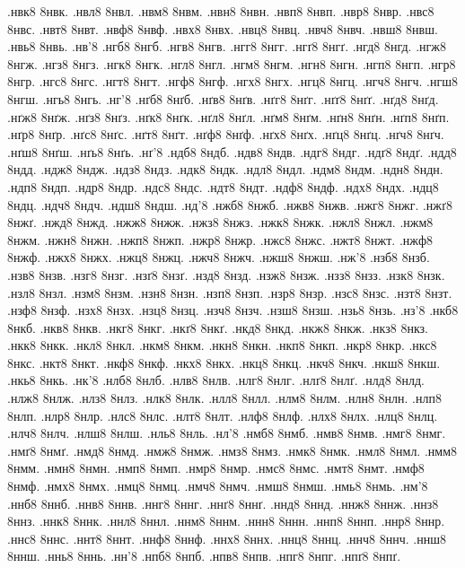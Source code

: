 {.нвк8
8нвк.
.нвл8
8нвл.
.нвм8
8нвм.
.нвн8
8нвн.
.нвп8
8нвп.
.нвр8
8нвр.
.нвс8
8нвс.
.нвт8
8нвт.
.нвф8
8нвф.
.нвх8
8нвх.
.нвц8
8нвц.
.нвч8
8нвч.
.нвш8
8нвш.
.нвь8
8нвь.
.нв'8
.нгб8
8нгб.
.нгв8
8нгв.
.нгг8
8нгг.
.нгґ8
8нгґ.
.нгд8
8нгд.
.нгж8
8нгж.
.нгз8
8нгз.
.нгк8
8нгк.
.нгл8
8нгл.
.нгм8
8нгм.
.нгн8
8нгн.
.нгп8
8нгп.
.нгр8
8нгр.
.нгс8
8нгс.
.нгт8
8нгт.
.нгф8
8нгф.
.нгх8
8нгх.
.нгц8
8нгц.
.нгч8
8нгч.
.нгш8
8нгш.
.нгь8
8нгь.
.нг'8
.нґб8
8нґб.
.нґв8
8нґв.
.нґг8
8нґг.
.нґґ8
8нґґ.
.нґд8
8нґд.
.нґж8
8нґж.
.нґз8
8нґз.
.нґк8
8нґк.
.нґл8
8нґл.
.нґм8
8нґм.
.нґн8
8нґн.
.нґп8
8нґп.
.нґр8
8нґр.
.нґс8
8нґс.
.нґт8
8нґт.
.нґф8
8нґф.
.нґх8
8нґх.
.нґц8
8нґц.
.нґч8
8нґч.
.нґш8
8нґш.
.нґь8
8нґь.
.нґ'8
.ндб8
8ндб.
.ндв8
8ндв.
.ндг8
8ндг.
.ндґ8
8ндґ.
.ндд8
8ндд.
.ндж8
8ндж.
.ндз8
8ндз.
.ндк8
8ндк.
.ндл8
8ндл.
.ндм8
8ндм.
.ндн8
8ндн.
.ндп8
8ндп.
.ндр8
8ндр.
.ндс8
8ндс.
.ндт8
8ндт.
.ндф8
8ндф.
.ндх8
8ндх.
.ндц8
8ндц.
.ндч8
8ндч.
.ндш8
8ндш.
.нд'8
.нжб8
8нжб.
.нжв8
8нжв.
.нжг8
8нжг.
.нжґ8
8нжґ.
.нжд8
8нжд.
.нжж8
8нжж.
.нжз8
8нжз.
.нжк8
8нжк.
.нжл8
8нжл.
.нжм8
8нжм.
.нжн8
8нжн.
.нжп8
8нжп.
.нжр8
8нжр.
.нжс8
8нжс.
.нжт8
8нжт.
.нжф8
8нжф.
.нжх8
8нжх.
.нжц8
8нжц.
.нжч8
8нжч.
.нжш8
8нжш.
.нж'8
.нзб8
8нзб.
.нзв8
8нзв.
.нзг8
8нзг.
.нзґ8
8нзґ.
.нзд8
8нзд.
.нзж8
8нзж.
.нзз8
8нзз.
.нзк8
8нзк.
.нзл8
8нзл.
.нзм8
8нзм.
.нзн8
8нзн.
.нзп8
8нзп.
.нзр8
8нзр.
.нзс8
8нзс.
.нзт8
8нзт.
.нзф8
8нзф.
.нзх8
8нзх.
.нзц8
8нзц.
.нзч8
8нзч.
.нзш8
8нзш.
.нзь8
8нзь.
.нз'8
.нкб8
8нкб.
.нкв8
8нкв.
.нкг8
8нкг.
.нкґ8
8нкґ.
.нкд8
8нкд.
.нкж8
8нкж.
.нкз8
8нкз.
.нкк8
8нкк.
.нкл8
8нкл.
.нкм8
8нкм.
.нкн8
8нкн.
.нкп8
8нкп.
.нкр8
8нкр.
.нкс8
8нкс.
.нкт8
8нкт.
.нкф8
8нкф.
.нкх8
8нкх.
.нкц8
8нкц.
.нкч8
8нкч.
.нкш8
8нкш.
.нкь8
8нкь.
.нк'8
.нлб8
8нлб.
.нлв8
8нлв.
.нлг8
8нлг.
.нлґ8
8нлґ.
.нлд8
8нлд.
.нлж8
8нлж.
.нлз8
8нлз.
.нлк8
8нлк.
.нлл8
8нлл.
.нлм8
8нлм.
.нлн8
8нлн.
.нлп8
8нлп.
.нлр8
8нлр.
.нлс8
8нлс.
.нлт8
8нлт.
.нлф8
8нлф.
.нлх8
8нлх.
.нлц8
8нлц.
.нлч8
8нлч.
.нлш8
8нлш.
.нль8
8нль.
.нл'8
.нмб8
8нмб.
.нмв8
8нмв.
.нмг8
8нмг.
.нмґ8
8нмґ.
.нмд8
8нмд.
.нмж8
8нмж.
.нмз8
8нмз.
.нмк8
8нмк.
.нмл8
8нмл.
.нмм8
8нмм.
.нмн8
8нмн.
.нмп8
8нмп.
.нмр8
8нмр.
.нмс8
8нмс.
.нмт8
8нмт.
.нмф8
8нмф.
.нмх8
8нмх.
.нмц8
8нмц.
.нмч8
8нмч.
.нмш8
8нмш.
.нмь8
8нмь.
.нм'8
.ннб8
8ннб.
.ннв8
8ннв.
.ннг8
8ннг.
.ннґ8
8ннґ.
.ннд8
8ннд.
.ннж8
8ннж.
.ннз8
8ннз.
.ннк8
8ннк.
.ннл8
8ннл.
.ннм8
8ннм.
.ннн8
8ннн.
.ннп8
8ннп.
.ннр8
8ннр.
.ннс8
8ннс.
.ннт8
8ннт.
.ннф8
8ннф.
.ннх8
8ннх.
.ннц8
8ннц.
.ннч8
8ннч.
.ннш8
8ннш.
.ннь8
8ннь.
.нн'8
.нпб8
8нпб.
.нпв8
8нпв.
.нпг8
8нпг.
.нпґ8
8нпґ.
}
